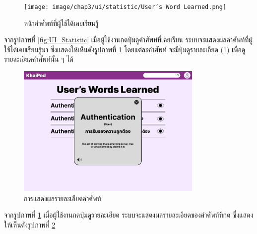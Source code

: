 \documentclass[12pt,oneside,openright,a4paper]{cpe-thai-project}
\begin{document}
\begin{figure}[!h]\centering
	\texttt{[image: image/chap3/ui/statistic/User’s Word Learned.png]}
	\caption{หน้าคำศัพท์ที่ผู้ใช้ได้เคยเรียนรู้}\label{fig:UI_WordLearned}
\end{figure}
\hspace{1cm}
จากรูปภาพที่ \ref{fig:UI_Statistic} เมื่อผู้ใช้งานกดปุ่มดูคำศัพท์ที่เคยเรียน ระบบจะแสดงผลคำศัพท์ที่ผู้ใช้ได้เคยเรียนรู้มา ซึ่งแสดงให้เห็นดังรูปภาพที่ \ref{fig:UI_WordLearned}
โดยแต่ละคำศัพท์ จะมีปุ่มดูรายละเอียด (1) เพื่อดูรายละเอียดคำศัพท์นั้น ๆ ได้

\pagebreak
\begin{figure}[!h]\centering
	\includegraphics[width=0.8\textwidth, keepaspectratio=true]{image/chap3/ui/statistic/Word Learned detail.png}
	\caption{การแสดงผลรายละเอียดคำศัพท์}\label{fig:UI_WordLearnedDetail}
\end{figure}
\hspace{1cm}
จากรูปภาพที่ \ref{fig:UI_WordLearned} เมื่อผู้ใช้งานกดปุ่มดูรายละเอียด ระบบจะแสดงผลรายละเอียดของคำศัพท์ที่กด ซึ่งแสดงให้เห็นดังรูปภาพที่ \ref{fig:UI_WordLearnedDetail}

\pagebreak
\end{document}
